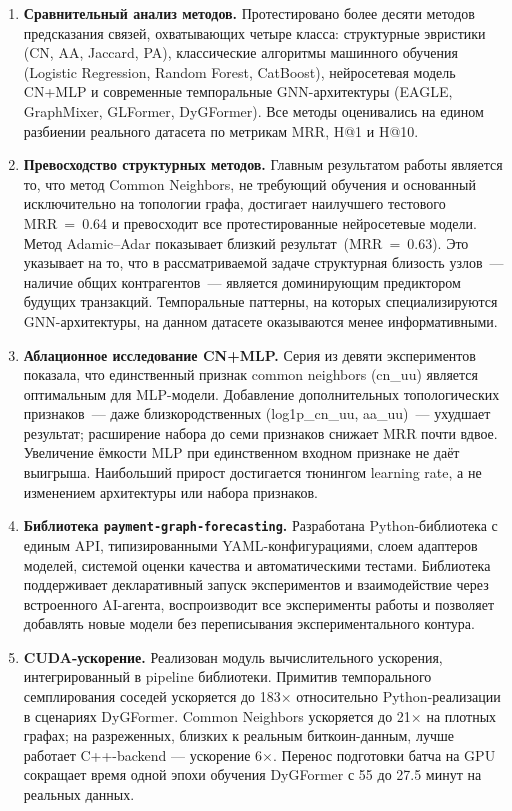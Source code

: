 \documentclass[a4paper,12pt]{extarticle}
\begin{document}
\begin{enumerate}
    \item \textbf{Сравнительный анализ методов.} Протестировано более десяти методов предсказания связей, охватывающих четыре класса: структурные эвристики (CN, AA, Jaccard, PA), классические алгоритмы машинного обучения (Logistic Regression, Random Forest, CatBoost), нейросетевая модель CN+MLP и современные темпоральные GNN-архитектуры (EAGLE, GraphMixer, GLFormer, DyGFormer). Все методы оценивались на едином разбиении реального датасета по метрикам MRR, H@1 и H@10.

    \item \textbf{Превосходство структурных методов.} Главным результатом работы является то, что метод Common Neighbors, не требующий обучения и основанный исключительно на топологии графа, достигает наилучшего тестового MRR~=~0.64 и превосходит все протестированные нейросетевые модели. Метод Adamic--Adar показывает близкий результат~(MRR~=~0.63). Это указывает на то, что в рассматриваемой задаче структурная близость узлов~--- наличие общих контрагентов~--- является доминирующим предиктором будущих транзакций. Темпоральные паттерны, на которых специализируются GNN-архитектуры, на данном датасете оказываются менее информативными.

    \item \textbf{Аблационное исследование CN+MLP.} Серия из девяти экспериментов показала, что единственный признак common neighbors (cn\_uu) является оптимальным для MLP-модели. Добавление дополнительных топологических признаков~--- даже близкородственных (log1p\_cn\_uu, aa\_uu)~--- ухудшает результат; расширение набора до семи признаков снижает MRR почти вдвое. Увеличение ёмкости MLP при единственном входном признаке не даёт выигрыша. Наибольший прирост достигается тюнингом learning rate, а не изменением архитектуры или набора признаков.

	\item \textbf{Библиотека \texttt{payment-graph-forecasting}.} Разработана Python-библиотека с единым API, типизированными YAML-конфигурациями, слоем адаптеров моделей, системой оценки качества и автоматическими тестами. Библиотека поддерживает декларативный запуск экспериментов и взаимодействие через встроенного AI-агента, воспроизводит все эксперименты работы и позволяет добавлять новые модели без переписывания экспериментального контура.
    
	\item \textbf{CUDA-ускорение.} Реализован модуль вычислительного ускорения, интегрированный в pipeline библиотеки. Примитив темпорального семплирования соседей ускоряется до 183$\times$ относительно Python-реализации в сценариях DyGFormer. Common Neighbors ускоряется до 21$\times$ на плотных графах; на разреженных, близких к реальным биткоин-данным, лучше работает C++-backend --- ускорение 6$\times$. Перенос подготовки батча на GPU сокращает время одной эпохи обучения DyGFormer с 55 до 27.5 минут на реальных данных.
\end{enumerate}
\end{document}

